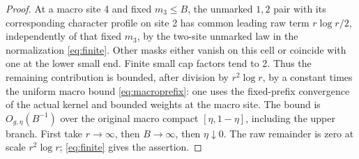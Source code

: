 \begin{proof}
At a macro site 4 and fixed \(m_3\le B\), the unmarked \(1,2\) pair with its corresponding character profile on site 2 has common leading raw term \(r\log r/2\), independently of that fixed \(m_3\), by the two-site unmarked law in the normalization \eqref{eq:finite}. Other masks either vanish on this cell or coincide with one at the lower small end. Finite small cap factors tend to 2. Thus the remaining contribution is bounded, after division by \(r^2\log r\), by a constant times the uniform macro bound \eqref{eq:macroprefix}: one uses the fixed-prefix convergence of the actual kernel and bounded weights at the macro site. The bound is \(O_{g,\eta}(B^{-1})\) over the original macro compact \([\eta,1-\eta]\), including the upper branch. First take \(r\to\infty\), then \(B\to\infty\), then \(\eta\downarrow0\). The raw remainder is zero at scale \(r^2\log r\); \eqref{eq:finite} gives the assertion.
\end{proof}
